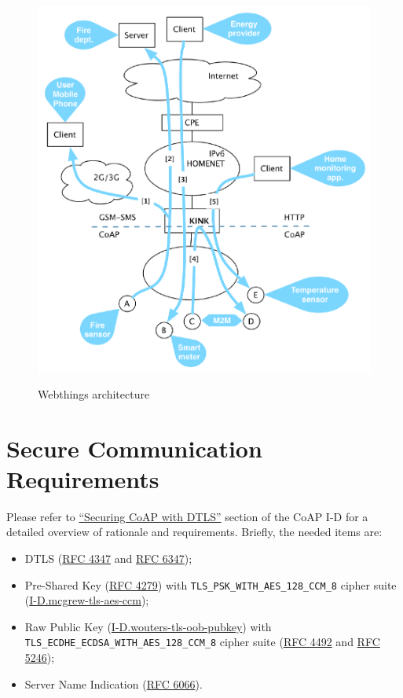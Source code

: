 \documentclass[10pt]{article}
\begin{document}
\begin{figure}
  \centering
  \includegraphics[width=12cm,height=13cm]{../share/images/kink-homenet}
    \caption{Webthings architecture}
    \label{fig:arch}
\end{figure}

\newpage
\section{Secure Communication Requirements}

Please refer to \href{http://tools.ietf.org/html/draft-ietf-core-coap-08#section-10.1}{``Securing CoAP with DTLS''} section of the CoAP I-D for a detailed overview of rationale and requirements.  Briefly, the needed items are:

\begin{itemize}
\item DTLS (\href{http://tools.ietf.org/html/rfc4347}{RFC 4347} and \href{http://tools.ietf.org/html/rfc6347}{RFC 6347});
\item Pre-Shared Key (\href{http://tools.ietf.org/html/rfc4279}{RFC 4279}) with \texttt{TLS\_PSK\_WITH\_AES\_128\_CCM\_8} cipher suite (\href{http://tools.ietf.org/html/draft-mcgrew-tls-aes-ccm-ecc-02}{I-D.mcgrew-tls-aes-ccm});
\item Raw Public Key (\href{http://tools.ietf.org/html/draft-wouters-tls-oob-pubkey}{I-D.wouters-tls-oob-pubkey}) with \texttt{TLS\_ECDHE\_ECDSA\_WITH\_AES\_128\_CCM\_8} cipher suite (\href{http://tools.ietf.org/html/rfc4492}{RFC 4492} and \href{http://tools.ietf.org/html/rfc5246}{RFC 5246});
\item Server Name Indication (\href{http://tools.ietf.org/html/rfc6066}{RFC 6066}).
\end{itemize}
\end{document}
